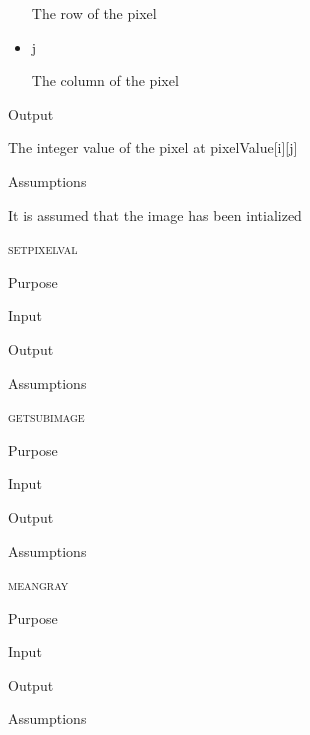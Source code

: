 \documentclass[pdftex, 11pt]{article}
\begin{document}
\begin{description}
\begin{description}
\begin{itemize}
						The row of the pixel

					\item{j} 

						The column of the pixel

				\end{itemize}

			\item{Output}

				The integer value of the pixel at 
				pixelValue[i][j]


			\item{Assumptions}

				It is assumed that the image has been intialized


		\end{description}


	\item{\textsc{setpixelval}}
		\begin{description}
			\item{Purpose}


			\item{Input}


			\item{Output}


			\item{Assumptions}


		\end{description}


	\item{\textsc{getsubimage}}
		\begin{description}
			\item{Purpose}


			\item{Input}


			\item{Output}


			\item{Assumptions}


		\end{description}


	\item{\textsc{meangray}}
		\begin{description}
			\item{Purpose}


			\item{Input}


			\item{Output}


			\item{Assumptions}



\end{description}
\end{description}
\end{document}
